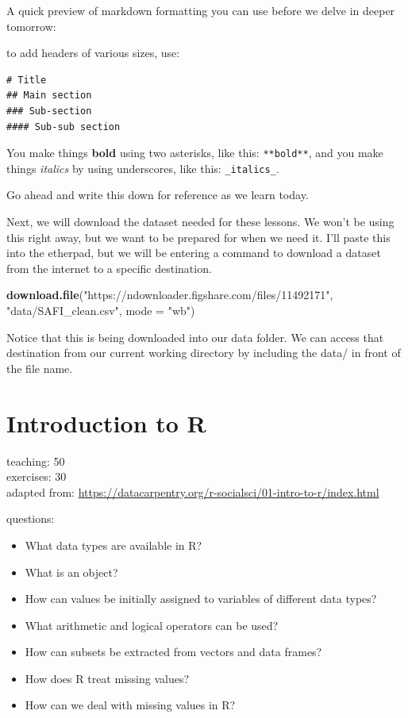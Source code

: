 \documentclass[]{book}
\newenvironment{Shaded}{\begin{snugshade}}{\end{snugshade}}
\newcommand{\KeywordTok}[1]{\textcolor[rgb]{0.13,0.29,0.53}{\textbf{#1}}}
\newcommand{\DataTypeTok}[1]{\textcolor[rgb]{0.13,0.29,0.53}{#1}}
\newcommand{\StringTok}[1]{\textcolor[rgb]{0.31,0.60,0.02}{#1}}
\newcommand{\NormalTok}[1]{#1}
\providecommand{\tightlist}{%
  \setlength{\itemsep}{0pt}\setlength{\parskip}{0pt}}
\begin{document}
A quick preview of markdown formatting you can use before we delve in
deeper tomorrow:

to add headers of various sizes, use:

\begin{verbatim}
# Title
## Main section
### Sub-section
#### Sub-sub section
\end{verbatim}

You make things \textbf{bold} using two asterisks, like this:
\texttt{**bold**}, and you make things \emph{italics} by using
underscores, like this: \texttt{\_italics\_}.

Go ahead and write this down for reference as we learn today.

Next, we will download the dataset needed for these lessons. We won't be
using this right away, but we want to be prepared for when we need it.
I'll paste this into the etherpad, but we will be entering a command to
download a dataset from the internet to a specific destination.

\begin{Shaded}
\begin{Highlighting}[]
\KeywordTok{download.file}\NormalTok{(}\StringTok{"https://ndownloader.figshare.com/files/11492171"}\NormalTok{,}
              \StringTok{"data/SAFI_clean.csv"}\NormalTok{, }\DataTypeTok{mode =} \StringTok{"wb"}\NormalTok{)}
\end{Highlighting}
\end{Shaded}

Notice that this is being downloaded into our data folder. We can access
that destination from our current working directory by including the
data/ in front of the file name.

\chapter{Introduction to R}\label{basicR}

teaching: 50\\
exercises: 30\\
adapted from:
\url{https://datacarpentry.org/r-socialsci/01-intro-to-r/index.html}

questions:

\begin{itemize}
\tightlist
\item
  What data types are available in R?\\
\item
  What is an object?\\
\item
  How can values be initially assigned to variables of different data
  types?\\
\item
  What arithmetic and logical operators can be used?\\
\item
  How can subsets be extracted from vectors and data frames?\\
\item
  How does R treat missing values?\\
\item
  How can we deal with missing values in R?
\end{itemize}
\end{document}
